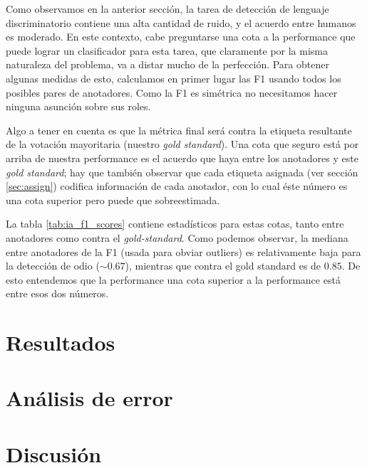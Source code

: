 Como observamos en la anterior sección, la tarea de detección de lenguaje discriminatorio contiene una alta cantidad de ruido, y el acuerdo entre humanos es moderado. En este contexto, cabe preguntarse una cota a la performance que puede lograr un clasificador para esta tarea, que claramente por la misma naturaleza del problema, va a distar mucho de la perfección. Para obtener algunas medidas de esto, calculamos en primer lugar las F1 usando todos los posibles pares de anotadores. Como la F1 es simétrica no necesitamos hacer ninguna asunción sobre sus roles.

Algo a tener en cuenta es que la métrica final será contra la etiqueta resultante de la votación mayoritaria (nuestro \emph{gold standard}). Una cota que seguro está por arriba de nuestra performance es el acuerdo que haya entre los anotadores y este \emph{gold standard}; hay que también observar que cada etiqueta asignada (ver sección \ref{sec:assign}) codifica información de cada anotador, con lo cual éste número es una cota superior pero puede que sobreestimada.


La tabla \ref{tab:ia_f1_scores} contiene estadísticos para estas cotas, tanto entre anotadores como contra el \emph{gold-standard}. Como podemos observar, la mediana entre anotadores de la F1 (usada para obviar outliers) es relativamente baja para la detección de odio ($\sim 0.67$), mientras que contra el gold standard es de $0.85$. De esto entendemos que la performance una cota superior a la performance está entre esos dos números.



\section{Resultados}



\section{Análisis de error}





\section{Discusión}

